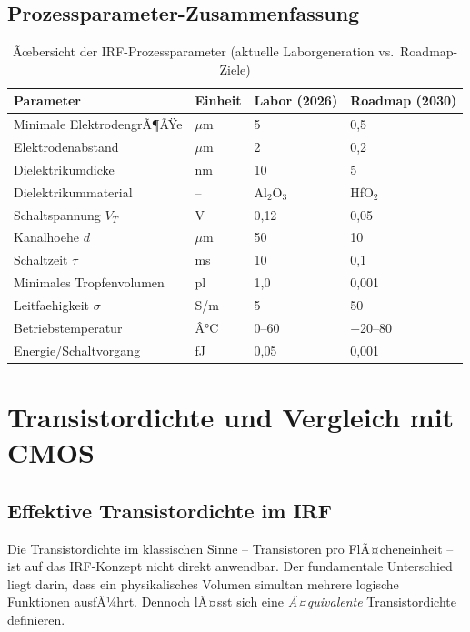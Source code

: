 ﻿\documentclass[a4paper,12pt]{scrreprt}
\theoremstyle{definition}
\begin{document}
\subsection{Prozessparameter-Zusammenfassung}

\begin{table}[H]
	\centering
	\caption{Ãœbersicht der IRF-Prozessparameter (aktuelle Laborgeneration vs.\ Roadmap-Ziele)}
	\label{tab:prozessparameter}
	\begin{tabular}{llll}
		\toprule
		\textbf{Parameter} & \textbf{Einheit} & \textbf{Labor (2026)} & \textbf{Roadmap (2030)} \\
		\midrule
		Minimale ElektrodengrÃ¶ÃŸe & $\mu$m & 5 & 0{,}5 \\
		Elektrodenabstand & $\mu$m & 2 & 0{,}2 \\
		Dielektrikumdicke & nm & 10 & 5 \\
		Dielektrikummaterial & -- & Al$_2$O$_3$ & HfO$_2$ \\
		Schaltspannung $V_T$ & V & 0{,}12 & 0{,}05 \\
		Kanalhoehe $d$ & $\mu$m & 50 & 10 \\
		Schaltzeit $\tau$ & ms & 10 & 0{,}1 \\
		Minimales Tropfenvolumen & pl & 1{,}0 & 0{,}001 \\
		Leitfaehigkeit $\sigma$ & S/m & 5 & 50 \\
		Betriebstemperatur & Â°C & 0--60 & $-$20--80 \\
		Energie/Schaltvorgang & fJ & 0{,}05 & 0{,}001 \\
		\bottomrule
	\end{tabular}
\end{table}

\section{Transistordichte und Vergleich mit CMOS}

\subsection{Effektive Transistordichte im IRF}

Die Transistordichte im klassischen Sinne -- Transistoren pro FlÃ¤cheneinheit --
ist auf das IRF-Konzept nicht direkt anwendbar. Der fundamentale Unterschied
liegt darin, dass ein physikalisches Volumen simultan mehrere logische Funktionen
ausfÃ¼hrt. Dennoch lÃ¤sst sich eine \emph{Ã¤quivalente} Transistordichte definieren.
\end{document}
